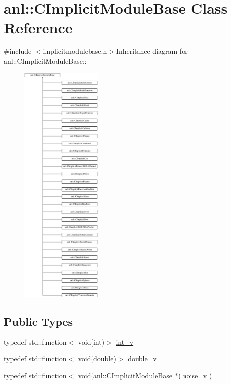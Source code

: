 \hypertarget{classanl_1_1CImplicitModuleBase}{
\section{anl::CImplicitModuleBase Class Reference}
\label{classanl_1_1CImplicitModuleBase}
}


{\ttfamily \#include $<$implicitmodulebase.h$>$}Inheritance diagram for anl::CImplicitModuleBase::\begin{figure}[H]
\begin{center}
\leavevmode
\includegraphics[height=12cm]{classanl_1_1CImplicitModuleBase}
\end{center}
\end{figure}
\subsection*{Public Types}
\begin{DoxyCompactItemize}
\item 
typedef std::function$<$ void(int)$>$ \hyperlink{classanl_1_1CImplicitModuleBase_a0af03005949051c16a5c063dd73b5eb8}{int\_\-v}
\item 
typedef std::function$<$ void(double)$>$ \hyperlink{classanl_1_1CImplicitModuleBase_a32d06aeb408b2063f45ad8c1d455e16c}{double\_\-v}
\item 
typedef std::function$<$ void(\hyperlink{classanl_1_1CImplicitModuleBase}{anl::CImplicitModuleBase} $\ast$) \hyperlink{classanl_1_1CImplicitModuleBase_a29276d273677a9928320cfb6118de3ba}{noise\_\-v} )
\end{DoxyCompactItemize}
